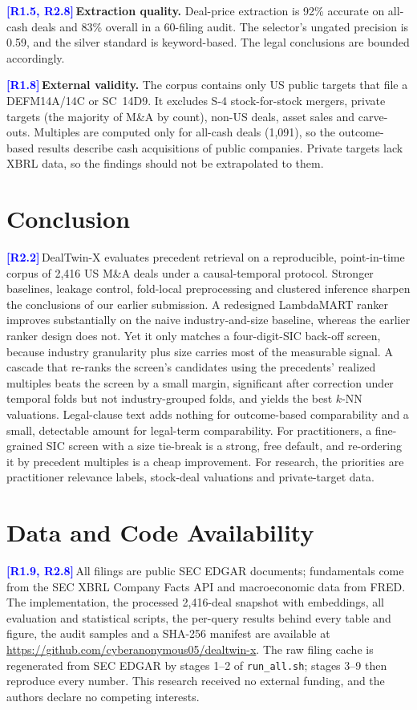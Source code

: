 \documentclass[conference]{IEEEtran}
\newcommand{\rc}[1]{\textcolor{blue}{\textbf{[#1]}}\,}
\newcommand{\rc}[1]{}
\begin{document}
\rc{R1.5, R2.8}\noindent\textbf{Extraction quality.} Deal-price extraction is 92\% accurate on all-cash deals and 83\% overall in a 60-filing audit. The selector's ungated precision is 0.59, and the silver standard is keyword-based. The legal conclusions are bounded accordingly.

\rc{R1.8}\noindent\textbf{External validity.} The corpus contains only US public targets that file a DEFM14A/14C or SC~14D9. It excludes S-4 stock-for-stock mergers, private targets (the majority of M\&A by count), non-US deals, asset sales and carve-outs. Multiples are computed only for all-cash deals (1{,}091), so the outcome-based results describe cash acquisitions of public companies. Private targets lack XBRL data, so the findings should not be extrapolated to them.

\section{Conclusion}
\label{sec:conclusion}

\rc{R2.2}DealTwin-X evaluates precedent retrieval on a reproducible, point-in-time corpus of 2{,}416 US M\&A deals under a causal-temporal protocol. Stronger baselines, leakage control, fold-local preprocessing and clustered inference sharpen the conclusions of our earlier submission. A redesigned LambdaMART ranker improves substantially on the naive industry-and-size baseline, whereas the earlier ranker design does not. Yet it only matches a four-digit-SIC back-off screen, because industry granularity plus size carries most of the measurable signal. A cascade that re-ranks the screen's candidates using the precedents' realized multiples beats the screen by a small margin, significant after correction under temporal folds but not industry-grouped folds, and yields the best $k$-NN valuations. Legal-clause text adds nothing for outcome-based comparability and a small, detectable amount for legal-term comparability. For practitioners, a fine-grained SIC screen with a size tie-break is a strong, free default, and re-ordering it by precedent multiples is a cheap improvement. For research, the priorities are practitioner relevance labels, stock-deal valuations and private-target data.

\section*{Data and Code Availability}
\label{sec:data}
\rc{R1.9, R2.8}All filings are public SEC EDGAR documents; fundamentals come from the SEC XBRL Company Facts API and macroeconomic data from FRED. The implementation, the processed 2{,}416-deal snapshot with embeddings, all evaluation and statistical scripts, the per-query results behind every table and figure, the audit samples and a SHA-256 manifest are available at \url{https://github.com/cyberanonymous05/dealtwin-x}. The raw filing cache is regenerated from SEC EDGAR by stages 1--2 of \texttt{run\_all.sh}; stages 3--9 then reproduce every number. This research received no external funding, and the authors declare no competing interests.
\end{document}
